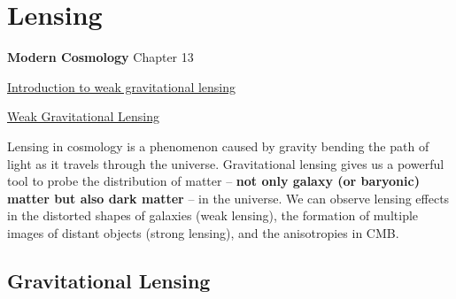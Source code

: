\chapter{Lensing}

\begin{introduction}
    \item \textbf{Modern Cosmology} Chapter 13
    \item \href{https://oguri.github.io/lectures/2020ssgc/ssgc2020.pdf}{Introduction to weak gravitational lensing}
    \item \href{https://arxiv.org/pdf/2501.07938}{Weak Gravitational Lensing}
\end{introduction}

Lensing in cosmology is a phenomenon caused by gravity bending the path of light as it travels through the universe. Gravitational lensing gives us a powerful tool to probe the distribution of matter -- \textbf{not only galaxy (or baryonic) matter but also dark matter} -- in the universe. We can observe lensing effects in the distorted shapes of galaxies (weak lensing), the formation of multiple images of distant objects (strong lensing), and the anisotropies in CMB.


\section{Gravitational Lensing}

